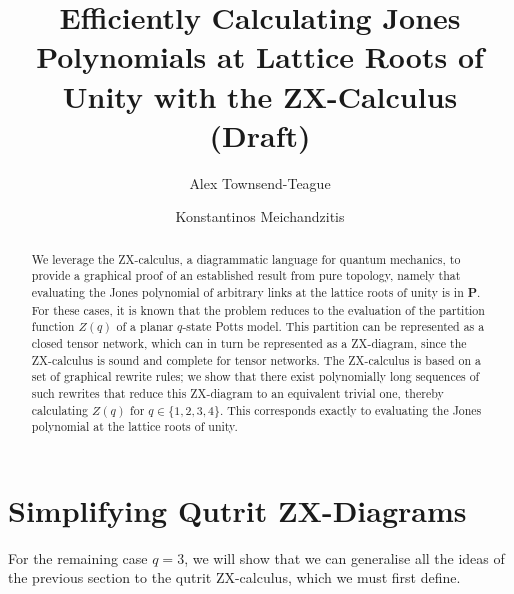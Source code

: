 \documentclass[11pt, oneside]{article}      %
\title{\textbf{Efficiently Calculating Jones Polynomials at Lattice Roots of Unity with the ZX-Calculus (Draft)}}
\author{
  Alex Townsend-Teague
  \and
  Konstantinos Meichandzitis
}
\date{}
\begin{document}
\maketitle
\begin{abstract}
	We leverage the ZX-calculus, a diagrammatic language for quantum mechanics, to provide a graphical proof of an established result from pure topology, namely that evaluating the Jones polynomial of arbitrary links at the lattice roots of unity is in \textbf{P}. For these cases, it is known that the problem reduces to the evaluation of the partition function $Z(q)$ of a planar $q$-state Potts model. This partition can be represented as a closed tensor network, which can in turn be represented as a ZX-diagram, since the ZX-calculus is sound and complete for tensor networks. The ZX-calculus is based on a set of graphical rewrite rules; we show that there exist polynomially long sequences of such rewrites that reduce this ZX-diagram to an equivalent trivial one, thereby calculating $Z(q)$ for $q \in \{1, 2, 3, 4\}$. This corresponds exactly to evaluating the Jones polynomial at the lattice roots of unity. 

\end{abstract}

 



\section{Simplifying Qutrit ZX-Diagrams}

For the remaining case $q=3$, we will show that we can generalise all the ideas of the previous section to the qutrit ZX-calculus, which we must first define.







\appendix

\end{document}

